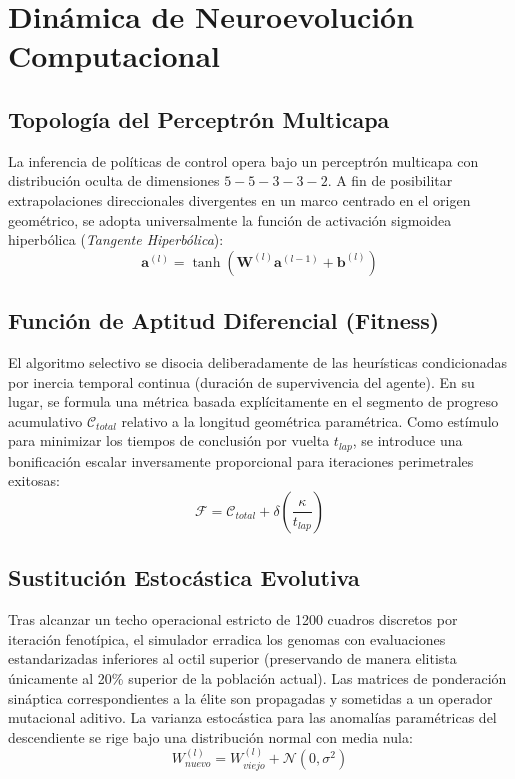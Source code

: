 \documentclass[10pt,twocolumn,letterpaper]{article}
\begin{document}
\section{Dinámica de Neuroevolución Computacional}

\subsection{Topología del Perceptrón Multicapa}
La inferencia de políticas de control opera bajo un perceptrón multicapa con distribución oculta de dimensiones $5-5-3-3-2$. A fin de posibilitar extrapolaciones direccionales divergentes en un marco centrado en el origen geométrico, se adopta universalmente la función de activación sigmoidea hiperbólica (\textit{Tangente Hiperbólica}):
\begin{equation}
\mathbf{a}^{(l)} = \tanh \left( \mathbf{W}^{(l)} \mathbf{a}^{(l-1)} + \mathbf{b}^{(l)} \right)
\end{equation}

\subsection{Función de Aptitud Diferencial (Fitness)}
El algoritmo selectivo se disocia deliberadamente de las heurísticas condicionadas por inercia temporal continua (duración de supervivencia del agente). En su lugar, se formula una métrica basada explícitamente en el segmento de progreso acumulativo $\mathcal{C}_{total}$ relativo a la longitud geométrica paramétrica. Como estímulo para minimizar los tiempos de conclusión por vuelta $t_{lap}$, se introduce una bonificación escalar inversamente proporcional para iteraciones perimetrales exitosas:
\begin{equation}
\mathcal{F} = \mathcal{C}_{total} + \delta \left( \frac{\kappa}{t_{lap}} \right)
\end{equation}

\subsection{Sustitución Estocástica Evolutiva}
Tras alcanzar un techo operacional estricto de 1200 cuadros discretos por iteración fenotípica, el simulador erradica los genomas con evaluaciones estandarizadas inferiores al octil superior (preservando de manera elitista únicamente al 20\% superior de la población actual). Las matrices de ponderación sináptica correspondientes a la élite son propagadas y sometidas a un operador mutacional aditivo. La varianza estocástica para las anomalías paramétricas del descendiente se rige bajo una distribución normal con media nula:
\begin{equation}
W^{(l)}_{nuevo} = W^{(l)}_{viejo} + \mathcal{N}\left(0, \sigma^2 \right)
\end{equation}
\end{document}
